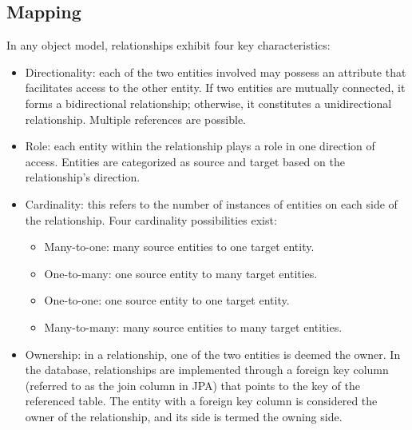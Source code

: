 \subsection{Mapping}
In any object model, relationships exhibit four key characteristics:
\begin{itemize}
    \item Directionality: each of the two entities involved may possess an attribute that facilitates access to the other entity.
        If two entities are mutually connected, it forms a bidirectional relationship; otherwise, it constitutes a unidirectional relationship.
        Multiple references are possible.
    \item Role: each entity within the relationship plays a role in one direction of access. 
        Entities are categorized as source and target based on the relationship's direction.
    \item Cardinality: this refers to the number of instances of entities on each side of the relationship.
        Four cardinality possibilities exist: 
        \begin{itemize}
            \item Many-to-one: many source entities to one target entity.
            \item One-to-many: one source entity to many target entities.
            \item One-to-one: one source entity to one target entity.
            \item Many-to-many: many source entities to many target entities.
        \end{itemize}
    \item Ownership: in a relationship, one of the two entities is deemed the owner.
        In the database, relationships are implemented through a foreign key column (referred to as the join column in JPA) that points to the key of the referenced table. 
        The entity with a foreign key column is considered the owner of the relationship, and its side is termed the owning side.
\end{itemize}

